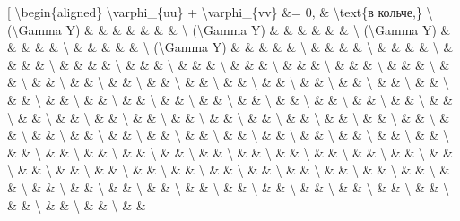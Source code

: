 \documentclass[
]{article}
\begin{document}
{{{{[} \textbackslash begin\{aligned\} \textbackslash varphi\_\{uu\} +
\textbackslash varphi\_\{vv\} \&= 0, \& \textbackslash text\{в кольче,\}
\textbackslash{} (\textbackslash Gamma Y) \& \& \& \& \& \& \&
\textbackslash{} (\textbackslash Gamma Y) \& \& \& \& \& \&
\textbackslash{} (\textbackslash Gamma Y) \& \& \& \& \&
\textbackslash{} \& \& \& \& \& \textbackslash{} (\textbackslash Gamma
Y) \& \& \& \& \& \textbackslash{} \& \& \& \& \textbackslash{} \& \& \&
\& \textbackslash{} \& \& \& \& \textbackslash{} \& \& \& \&
\textbackslash{} \& \& \& \textbackslash{} \& \& \& \textbackslash{} \&
\& \& \textbackslash{} \& \& \& \textbackslash{} \& \& \&
\textbackslash{} \& \& \& \textbackslash{} \& \& \textbackslash{} \& \&
\textbackslash{} \& \& \textbackslash{} \& \& \textbackslash{} \& \&
\textbackslash{} \& \& \textbackslash{} \& \& \textbackslash{} \& \&
\textbackslash{} \& \& \textbackslash{} \& \& \textbackslash{} \& \&
\textbackslash{} \& \& \textbackslash{} \& \& \textbackslash{} \& \&
\textbackslash{} \& \& \textbackslash{} \& \& \textbackslash{} \& \&
\textbackslash{} \& \& \textbackslash{} \& \& \textbackslash{} \& \&
\textbackslash{} \& \& \textbackslash{} \& \& \textbackslash{} \& \&
\textbackslash{} \& \& \textbackslash{} \& \& \textbackslash{} \& \&
\textbackslash{} \& \& \textbackslash{} \& \& \textbackslash{} \& \&
\textbackslash{} \& \& \textbackslash{} \& \& \textbackslash{} \& \&
\textbackslash{} \& \& \textbackslash{} \& \& \textbackslash{} \& \&
\textbackslash{} \& \& \textbackslash{} \& \& \textbackslash{} \& \&
\textbackslash{} \& \& \textbackslash{} \& \& \textbackslash{} \& \&
\textbackslash{} \& \& \textbackslash{} \& \& \textbackslash{} \& \&
\textbackslash{} \& \& \textbackslash{} \& \& \textbackslash{} \& \&
\textbackslash{} \& \& \textbackslash{} \& \& \textbackslash{} \& \&
\textbackslash{} \& \& \textbackslash{} \& \& \textbackslash{} \& \&
\textbackslash{} \& \& \textbackslash{} \& \& \textbackslash{} \& \&
\textbackslash{} \& \& \textbackslash{} \& \& \textbackslash{} \& \&
\textbackslash{} \& \& \textbackslash{} \& \& \textbackslash{} \& \&
\textbackslash{} \& \& \textbackslash{} \& \& \textbackslash{} \& \&
\textbackslash{} \& \& \textbackslash{} \& \& \textbackslash{} \& \&
\textbackslash{} \& \& \textbackslash{} \& \& \textbackslash{} \& \&
\textbackslash{} \& \& \textbackslash{} \& \& \textbackslash{} \& \&
\textbackslash{} \& \& \textbackslash{} \& \& \textbackslash{} \& \&
\textbackslash{} \& \& \textbackslash{} \& \& \textbackslash{} \& \&
\textbackslash{} \& \& \textbackslash{} \& \& \textbackslash{} \& \&
\textbackslash{} \& \& \textbackslash{} \& \& \textbackslash{} \& \&
}}}
\end{document}
